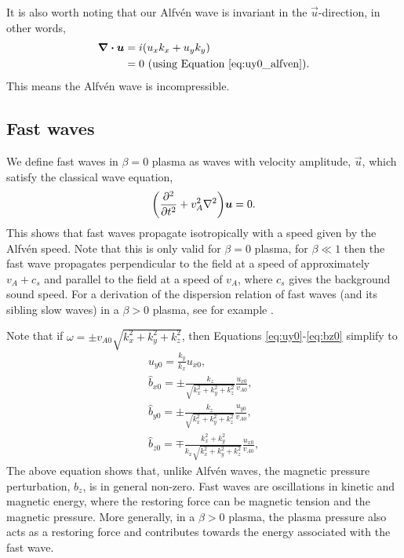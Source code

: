 It is also worth noting that our Alfv\'en wave is invariant in the  $\vec{u}$-direction, in other words,
\begin{equation}
\begin{aligned}
    \div{\vec{u}} &= i(u_xk_x  + u_yk_y) \\
    &= 0\ \text{(using Equation \ref{eq:uy0_alfven}).}
\end{aligned}
\end{equation}
This means the Alfv\'en wave is incompressible.

\subsection{Fast waves}

We define fast waves in $\beta=0$ plasma as waves with velocity amplitude, $\vec{u}$, which satisfy the classical wave equation,
\begin{equation}
    \qty(\pdv[2]{}{t}+v_A^2\laplacian)\vec{u}=0.
\end{equation}
This shows that fast waves propagate isotropically with a speed given by the Alfv\'en speed.
Note that this is only valid for $\beta=0$ plasma, for $\beta\ll 1$ then the fast wave propagates perpendicular to the field at a speed of approximately $v_A + c_s$ and parallel to the field at a speed of $v_A$, where $c_s$ gives the background sound speed. For a derivation of the dispersion relation of fast waves (and its sibling slow waves) in a $\beta>0$ plasma, see for example \citet{Priest2014, Roberts2019}.
 

Note that if $\omega=\pm v_{A0}\sqrt{k_x^2 + k_y^2 + k_z^2}$, then Equations \eqref{eq:uy0}-\eqref{eq:bz0} simplify to
\begin{gather}
    \label{eq:uy0_fast}
    u_{y0}=\frac{k_y}{k_x}u_{x0}, \\
    \label{eq:bx0_fast}
    \hat{b}_{x0} = \pm\frac{k_z}{\sqrt{k_x^2 + k_y^2 + k_z^2}}\frac{u_{x0}}{v_{A0}}, \\
    \label{eq:by0_fast}
    \hat{b}_{y0} = \pm\frac{k_z}{\sqrt{k_x^2 + k_y^2 + k_z^2}}\frac{u_{y0}}{v_{A0}}, \\
    \label{eq:bz0_fast}
    \hat{b}_{z0} = \mp\frac{k_x^2+k_y^2}{k_x\sqrt{k_x^2 + k_y^2 + k_z^2}}\frac{u_{x0}}{v_{A0}},
\end{gather}
The above equation shows that, unlike Alfv\'en waves, the magnetic pressure perturbation, $b_z$, is in general non-zero. Fast waves are oscillations in kinetic and magnetic energy, where the restoring force can be magnetic tension and the magnetic pressure. More generally, in a $\beta>0$ plasma, the plasma pressure also acts as a restoring force and contributes towards the energy associated with the fast wave.

